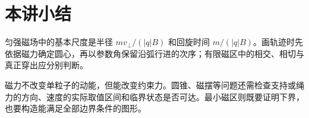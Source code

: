 \section{本讲小结}
匀强磁场中的基本尺度是半径 $mv_\perp/(|q|B)$ 和回旋时间 $m/(|q|B)$。画轨迹时先依据磁力确定圆心，再以参数角保留沿弧行进的次序；有限磁区中的相交、相切与真正穿出应分别判断。

磁力不改变单粒子的动能，但能改变约束力。圆锥、磁摆等问题还需检查支持或绳力的方向、速度的实际取值区间和临界状态是否可达。最小磁区则既要证明下界，也要构造能满足全部边界条件的图形。
